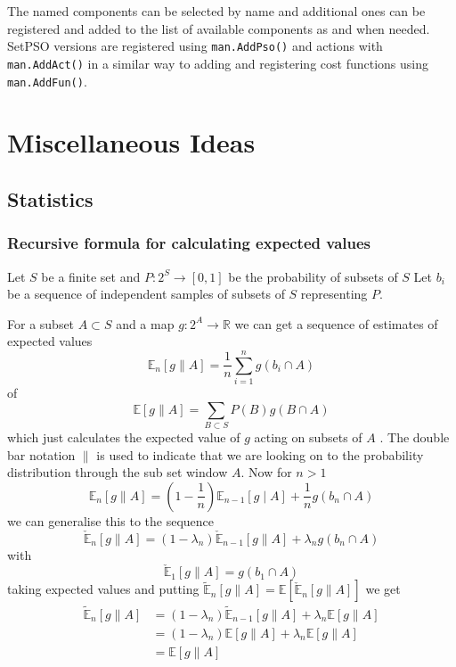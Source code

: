 \documentclass[a4paper,oneside,english]{book}
\numberwithin{equation}{section}
\numberwithin{figure}{section}
\begin{document}
The named components can be selected by name and additional ones can be registered and added to the list of available components  as and when needed. SetPSO versions are registered using \texttt{man.AddPso()} and actions with \texttt{man.AddAct()} in a similar way to adding and registering  cost functions using \texttt{man.AddFun()}. 



\part{Miscellaneous Ideas}
\chapter{Statistics}


\section{Recursive formula for calculating expected values}


Let $S$ be a finite set and $P:2^S \longrightarrow [0,1]$ be the probability of subsets of $S$
Let $b_{i}$ be a sequence of independent samples of subsets of $S$ 
representing $P$. 

For a subset $A\subset S$ and a map $g:2^{A}\rightarrow\mathbb{R}$
we can get a sequence of estimates of expected values
\[
\mathbb{E}_{n}[g\parallel A]=\frac{1}{n}\sum_{i=1}^{n}g(b_{i}\cap A)
\]
of 
\[
\mathbb{E}[g\parallel A]=\sum_{B\subset S}P(B)g(B\cap A)
\]
which just calculates the expected value of $g$ acting on subsets
of $A$ . The double bar notation $\parallel$ is used to indicate
that we are looking on to the probability distribution through the
sub set window $A$. Now for $n>1$ 
\[
\mathbb{E}_{n}[g\parallel A]=\left(1-\frac{1}{n}\right)\mathbb{E}_{n-1}[g\mid A]+\frac{1}{n}g(b_{n}\cap A)
\]
we can generalise this to the sequence 
\[
\check{\mathbb{E}}_{n}[g\parallel A]=\left(1-\lambda_{n}\right)\mathbb{\check{E}}_{n-1}[g\parallel A]+\lambda_{n}g(b_{n}\cap A)
\]
with 
\[
\check{\mathbb{E}}_{1}[g\parallel A]=g(b_{1}\cap A)
\]
taking expected values and putting $\mathbb{\tilde{E}}_{n}[g\parallel A]=\mathbb{E}\left[\check{\mathbb{E}}_{n}[g\parallel A]\right]$
we get
\begin{align}
\mathbb{\tilde{E}}_{n}[g\parallel A] & = (1-\lambda_{n})\mathbb{\tilde{E}}_{n-1}[g\parallel A]+\lambda_{n}\mathbb{E}[g\parallel A]\\
& = (1-\lambda_{n})\mathbb{\mathbb{E}}[g\parallel A]+\lambda_{n}\mathbb{E}[g\parallel A]\\
& = \mathbb{E}[g\parallel A]
\end{align}
\end{document}
